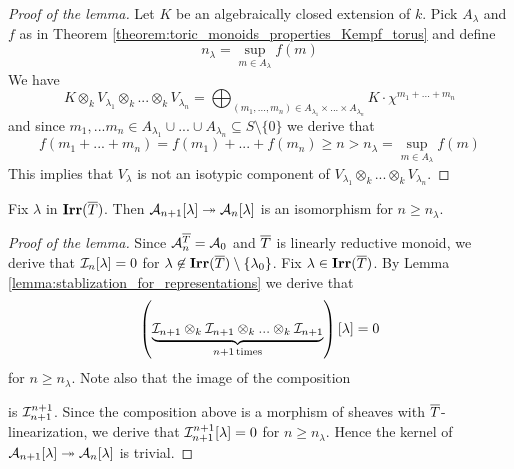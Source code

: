 \begin{proof}[Proof of the lemma]
Let $K$ be an algebraically closed extension of $k$. Pick $A_{\lambda}$ and $f$ as in Theorem \ref{theorem:toric_monoids_properties_Kempf_torus} and define
$$n_{\lambda} = \sup_{m\in A_{\lambda}}f(m)$$
We have
$$K\otimes_kV_{\lambda_1}\otimes_k...\otimes_kV_{\lambda_n} = \bigoplus_{(m_1,...,m_n)\in A_{\lambda_1}\times ...\times A_{\lambda_n}}K\cdot \chi^{m_1+...+m_n}$$
and since $m_1,...m_n\in A_{\lambda_1}\cup ...\cup A_{\lambda_n}\subseteq S\setminus \{0\}$ we derive that
$$f(m_1+...+m_n) = f(m_1) + ... + f(m_n) \geq n > n_{\lambda} = \sup_{m\in A_{\lambda}}f(m)$$
This implies that $V_{\lambda}$ is not an isotypic component of $V_{\lambda_1}\otimes_k...\otimes_kV_{\lambda_n}$.
\end{proof}

\begin{lemma}\label{lemma:stabilization_for_formal_schemes}
Fix $\lambda$ in $\mathbf{Irr}(\overline{T})$. Then ${\mathcal A}_{n+1}[\lambda]\twoheadrightarrow {\mathcal A}_n[\lambda]$ is an isomorphism for $n \geq  n_{\lambda}$.
\end{lemma}
\begin{proof}[Proof of the lemma]
Since ${\mathcal A}_n^{\overline{T}} = {\mathcal A}_0$ and $\overline{T}$ is linearly reductive monoid, we derive that ${\mathcal I}_n[\lambda] = 0$ for $\lambda \not \in \mathbf{Irr}(\overline{T})\setminus \{\lambda_0\}$. Fix $\lambda \in \mathbf{Irr}(\overline{T})$. By Lemma \ref{lemma:stablization_for_representations} we derive that
$$\left(\underbrace{{\mathcal I}_{n+1}\otimes_{k}{\mathcal I}_{n+1}\otimes_{k}...\otimes_{k}{\mathcal I}_{n+1}}_{n+1\,\mathrm{times}}\right)[\lambda] = 0$$
for $n \geq n_{\lambda}$. Note also that the image of the composition 
\begin{center}
\end{center}
is ${\mathcal I}_{n+1}^{n+1}$. Since the composition above is a morphism of sheaves with $\overline{T}$-linearization, we derive that ${\mathcal I}_{n+1}^{n+1}[\lambda]=0$ for $n \geq n_{\lambda}$. Hence the kernel of ${\mathcal A}_{n+1}[\lambda]\twoheadrightarrow {\mathcal A}_n[\lambda]$ is trivial.
\end{proof}

